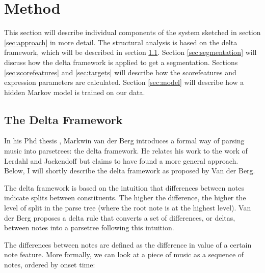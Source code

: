 \documentclass[a4paper,10pt]{article}
\begin{document}

\section{Method}
\label{sec:method}

This section will describe individual components of the system sketched in section \ref{sec:approach} in more detail. The structural analysis is based on the delta framework, which will be described in section \ref{sec:deltaframework}.  Section \ref{sec:segmentation} will discuss how the delta framework is applied to get a segmentation. Sections \ref{sec:scorefeatures} and \ref{sec:targets} will describe how the scorefeatures and expression parameters are calculated. Section \ref{sec:model} will describe how a hidden Markov model is trained on our data.

\subsection{The Delta Framework}
\label{sec:deltaframework}

In his Phd thesis \cite{markwin}, Markwin van der Berg introduces a formal way of parsing music into parsetrees: the delta framework. He relates his work to the work of Lerdahl and Jackendoff \cite{lerdahl1996generative} but claims to have found a more general approach. Below, I will shortly describe the delta framework as proposed by Van der Berg.

The delta framework is based on the intuition that differences between notes indicate splits between constituents. The higher the difference, the higher the level of split in the parse tree (where the root note is at the highest level). Van der Berg proposes a delta rule that converts a set of differences, or deltas, between notes into a parsetree following this intuition. 

The differences between notes are defined as the difference in value of a certain note feature. More formally, we can look at a piece of music as a sequence of notes, ordered by onset time:
\end{document}
